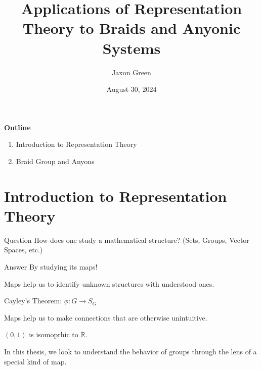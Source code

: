 \documentclass[compress,aspectratio=169,10pt,usenames,dvipsnames]{beamer}
\title[Thesis Defense]{Applications of Representation Theory to Braids and Anyonic Systems \\ \;}
\author[Jaxon Green]{Jaxon Green}
\institute[Cal Poly]{}%
\date{August 30, 2024}
\newcommand{\R}{\mathbb{R}}
\begin{document}
\begin{frame}
	\titlepage
\end{frame}

\begin{frame}
	\textbf{Outline}
	\begin{enumerate}
		\item Introduction to Representation Theory
		\item Braid Group and Anyons
	\end{enumerate}
\end{frame}


\section{Introduction to Representation Theory}
\begin{frame}
	\sectionpage
\end{frame}


\begin{frame}
	\vfill
	\begin{block}{Question}
		How does one study a mathematical structure? (Sets, Groups, Vector Spaces, etc.)
	\end{block}
	\vfill

	\begin{block}{Answer}
		By studying its maps!
	\end{block}
	
	\vfill
\end{frame}

\begin{frame}
	\vfill
	\begin{block}{}
		Maps help us to identify unknown structures with understood ones.
	\end{block}
	\vfill
	\begin{example}
		Cayley's Theorem: $\phi: G \rightarrow S_G$
	\end{example}
	\vfill
	\begin{block}{}
		Maps help us to make connections that are otherwise unintuitive.
	\end{block}
	\vfill
	\begin{example}
		$(0,1)$ is isomoprhic to $\R$.
	\end{example}
	\vfill
%
%
	\begin{block}{}
		In this thesis, we look to understand the behavior of groups through the lens of a special kind of map.
	\end{block}
	\vfill
\end{frame}
\end{document}

